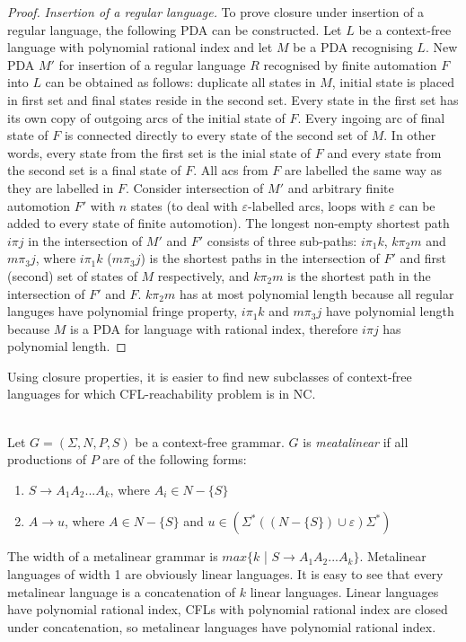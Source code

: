 \begin{proof}
\textit{Insertion of a regular language.} To prove closure under insertion of a regular language, the following PDA can be constructed. Let $L$ be a context-free language with polynomial rational index and let $M$ be a PDA recognising $L$. New PDA $M'$ for insertion of a regular language $R$ recognised by finite automation $F$ into $L$ can be obtained as follows: duplicate all states in $M$, initial state is placed in first set and final states reside in the second set. Every state in the first set has its own copy of outgoing arcs of the initial state of $F$. Every ingoing arc of final state of $F$ is connected directly to every state of the second set of $M$. In other words, every state from the first set is the inial state of $F$ and every state from the second set is a final state of $F$. All acs from $F$ are labelled the same way as they are labelled in $F$.
Consider intersection of $M'$ and arbitrary finite automotion $F'$ with $n$ states (to deal with $\varepsilon$-labelled arcs, loops with $\varepsilon$ can be added to every state of finite automotion). The longest non-empty shortest path $i \pi j$ in the intersection of $M'$ and $F'$ consists of three sub-paths: $i\pi_1k$, $k\pi_2m$ and $m\pi_3j$, where $i\pi_1k$ ($m\pi_3j$) is the shortest paths in the intersection of $F'$ and first (second) set of states of $M$ respectively, and $k\pi_2m$ is the shortest path in the intersection of $F'$ and $F$. $k\pi_2m$ has at most polynomial length because all regular languges have polynomial fringe property, $i\pi_1k$ and $m\pi_3j$ have polynomial length because $M$ is a PDA for language with rational index, therefore  $i \pi j$ has polynomial length.
\end{proof}


Using closure properties, it is easier to find new subclasses of context-free languages for which CFL-reachability problem is in NC.
\begin{example}
\\
Let $G = (\Sigma, N, P, S)$ be a context-free grammar. $G$ is \textit{meatalinear} if all productions of $P$ are of the following forms:
\begin{enumerate}
\item $S \rightarrow A_1A_2...A_k$, where $A_i \in N - \{S\}$
\item $A \rightarrow u$, where $A \in N - \{S\}$ and $u \in (\Sigma^*((N-\{S\}) \cup {\varepsilon})\Sigma^*)$
\end{enumerate}


The width of a metalinear grammar is $max\{k$ | $S \rightarrow A_1A_2...A_k \}$. Metalinear languages of width 1 are obviously linear languages. It is easy to see that every metalinear language is a concatenation of $k$ linear languages. Linear languages have polynomial rational index,  CFLs with polynomial rational index are closed under concatenation, so metalinear languages have polynomial rational index.
\end{example}

